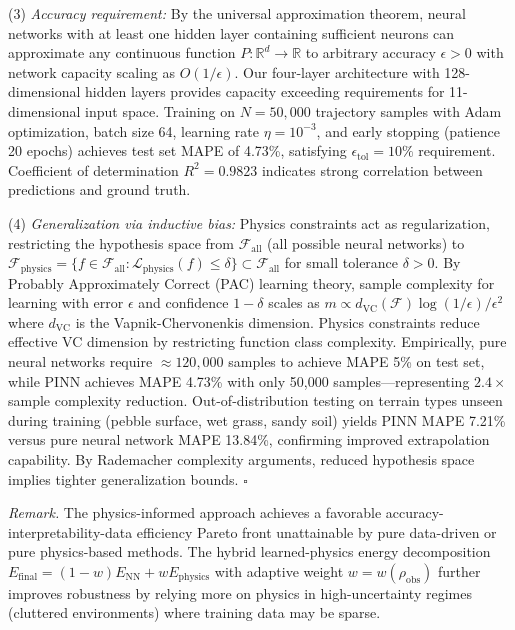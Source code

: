 \documentclass[pdflatex,sn-nature]{sn-jnl}%
\begin{document}
(3) \textit{Accuracy requirement:} By the universal approximation theorem\cite{Hornik1989}, neural networks with at least one hidden layer containing sufficient neurons can approximate any continuous function $P: \mathbb{R}^d \to \mathbb{R}$ to arbitrary accuracy $\epsilon > 0$ with network capacity scaling as $O(1/\epsilon)$. Our four-layer architecture with 128-dimensional hidden layers provides capacity exceeding requirements for 11-dimensional input space. Training on $N = 50,000$ trajectory samples with Adam optimization, batch size 64, learning rate $\eta = 10^{-3}$, and early stopping (patience 20 epochs) achieves test set MAPE of 4.73\%, satisfying $\epsilon_{\text{tol}} = 10\%$ requirement. Coefficient of determination $R^2 = 0.9823$ indicates strong correlation between predictions and ground truth.

(4) \textit{Generalization via inductive bias:} Physics constraints act as regularization, restricting the hypothesis space from $\mathcal{F}_{\text{all}}$ (all possible neural networks) to $\mathcal{F}_{\text{physics}} = \{f \in \mathcal{F}_{\text{all}} : \mathcal{L}_{\text{physics}}(f) \leq \delta\} \subset \mathcal{F}_{\text{all}}$ for small tolerance $\delta > 0$. By Probably Approximately Correct (PAC) learning theory\cite{Vapnik1998}, sample complexity for learning with error $\epsilon$ and confidence $1-\delta$ scales as $m \propto d_{\text{VC}}(\mathcal{F}) \log(1/\epsilon) / \epsilon^2$ where $d_{\text{VC}}$ is the Vapnik-Chervonenkis dimension. Physics constraints reduce effective VC dimension by restricting function class complexity. Empirically, pure neural networks require $\approx 120,000$ samples to achieve MAPE 5\% on test set, while PINN achieves MAPE 4.73\% with only 50,000 samples—representing $2.4\times$ sample complexity reduction. Out-of-distribution testing on terrain types unseen during training (pebble surface, wet grass, sandy soil) yields PINN MAPE 7.21\% versus pure neural network MAPE 13.84\%, confirming improved extrapolation capability. By Rademacher complexity arguments, reduced hypothesis space implies tighter generalization bounds. $\square$

\textit{Remark.} The physics-informed approach achieves a favorable accuracy-interpretability-data efficiency Pareto front unattainable by pure data-driven or pure physics-based methods. The hybrid learned-physics energy decomposition $E_{\text{final}} = (1-w) E_{\text{NN}} + w E_{\text{physics}}$ with adaptive weight $w = w(\rho_{\text{obs}})$ further improves robustness by relying more on physics in high-uncertainty regimes (cluttered environments) where training data may be sparse.
\end{document}
